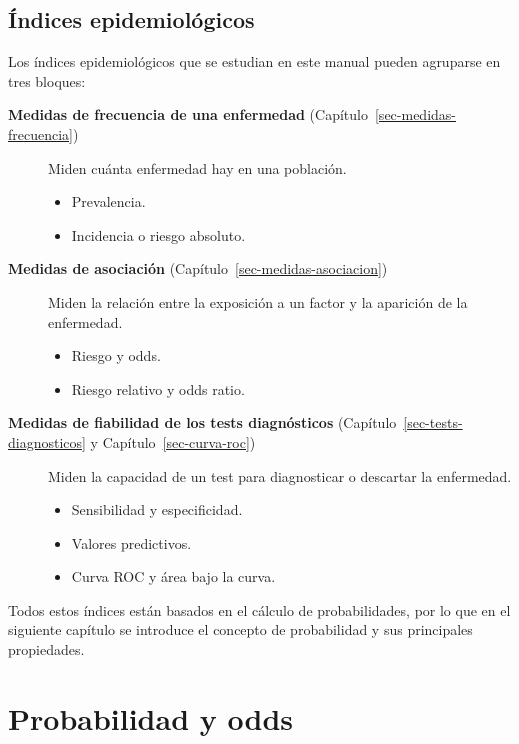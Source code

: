 \documentclass[
  spanish,
  a4paper,
]{scrreport}
\providecommand{\tightlist}{%
  \setlength{\itemsep}{0pt}\setlength{\parskip}{0pt}}
\theoremstyle{definition}
\theoremstyle{definition}
\theoremstyle{remark}
\begin{document}
\section{Índices epidemiológicos}\label{uxedndices-epidemioluxf3gicos}

Los índices epidemiológicos que se estudian en este manual pueden
agruparse en tres bloques:

\begin{description}
\item[\textbf{Medidas de frecuencia de una enfermedad}
(Capítulo~\ref{sec-medidas-frecuencia})]
Miden cuánta enfermedad hay en una población.

\begin{itemize}
\tightlist
\item
  Prevalencia.
\item
  Incidencia o riesgo absoluto.
\end{itemize}
\item[\textbf{Medidas de asociación}
(Capítulo~\ref{sec-medidas-asociacion})]
Miden la relación entre la exposición a un factor y la aparición de la
enfermedad.

\begin{itemize}
\tightlist
\item
  Riesgo y odds.
\item
  Riesgo relativo y odds ratio.
\end{itemize}
\item[\textbf{Medidas de fiabilidad de los tests diagnósticos}
(Capítulo~\ref{sec-tests-diagnosticos} y Capítulo~\ref{sec-curva-roc})]
Miden la capacidad de un test para diagnosticar o descartar la
enfermedad.

\begin{itemize}
\tightlist
\item
  Sensibilidad y especificidad.
\item
  Valores predictivos.
\item
  Curva ROC y área bajo la curva.
\end{itemize}
\end{description}

Todos estos índices están basados en el cálculo de probabilidades, por
lo que en el siguiente capítulo se introduce el concepto de probabilidad
y sus principales propiedades.


\chapter{Probabilidad y odds}\label{sec-probabilidad}
\end{document}
